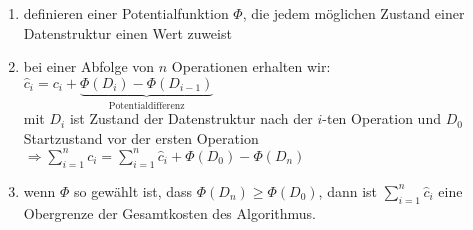 \begin{enumerate}
	\item definieren einer Potentialfunktion $\Phi$, die jedem möglichen Zustand einer Datenstruktur einen Wert zuweist
	\item bei einer Abfolge von $n$ Operationen erhalten wir: $\hat{c}_i = c_i + \underbrace{\Phi(D_i) - \Phi(D_{i-1})}_{\text{Potentialdifferenz}}$\\
	mit $D_i$ ist Zustand der Datenstruktur nach der $i$-ten Operation und $D_0$ Startzustand vor der ersten Operation\\
	$\Rightarrow \sum\limits_{i=1}^{n} c_i = \sum\limits_{i=1}^{n} \hat{c}_i + \Phi(D_0) - \Phi(D_n)$
	\item wenn $\Phi$ so gewählt ist, dass $\Phi(D_n) \geq \Phi(D_0)$, dann ist $\sum\limits_{i=1}^{n} \hat{c}_i$ eine Obergrenze der Gesamtkosten des Algorithmus.
\end{enumerate}
